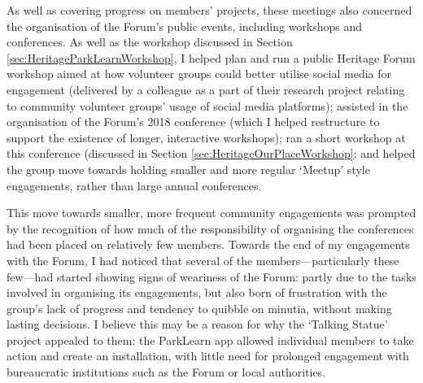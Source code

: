 As well as covering progress on members' projects, these meetings also concerned the organisation of the Forum's public events, including workshops and conferences. As well as the workshop discussed in Section \ref{sec:HeritageParkLearnWorkshop}, I helped plan and run a public Heritage Forum workshop aimed at how volunteer groups could better utilise social media for engagement (delivered by a colleague as a part of their research project relating to community volunteer groups' usage of social media platforms); assisted in the organisation of the Forum's 2018 conference (which I helped restructure to support the existence of longer, interactive workshops); ran a short workshop at this conference (discussed in Section \ref{sec:HeritageOurPlaceWorkshop}; and helped the group move towards holding smaller and more regular `Meetup' style engagements, rather than large annual conferences.

This move towards smaller, more frequent community engagements was prompted by the recognition of how much of the  responsibility of organising the conferences had been placed on relatively few members. Towards the end of my engagements with the Forum, I had noticed that several of the members---particularly these few---had started showing signs of weariness of the Forum: partly due to the tasks involved in organising its engagements, but also born of frustration with the group's lack of progress and tendency to quibble on minutia, without making lasting decisions. I believe this may be a reason for why the `Talking Statue' project appealed to them: the ParkLearn app allowed individual members to take action and create an installation, with little need for prolonged engagement with bureaucratic institutions such as the Forum or local authorities.

